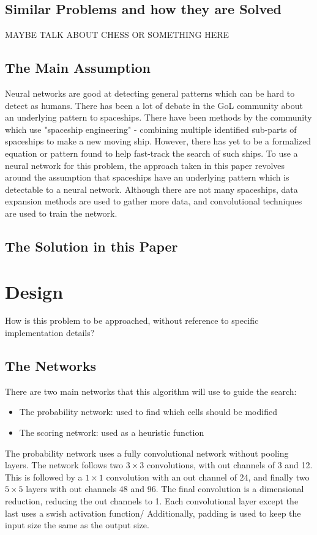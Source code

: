 \documentclass{l4proj}
\begin{document}
\section{Similar Problems and how they are Solved}

MAYBE TALK ABOUT CHESS OR SOMETHING HERE

\section{The Main Assumption}
Neural networks are good at detecting general patterns which can be hard to detect as humans. There has been a lot of debate in the GoL community about an underlying pattern to spaceships. There have been methods by the community which use "spaceship engineering" - combining multiple identified sub-parts of spaceships to make a new moving ship. However, there has yet to be a formalized equation or pattern found to help fast-track the search of such ships. To use a neural network for this problem, the approach taken in this paper revolves around the assumption that spaceships have an underlying pattern which is detectable to a neural network. Although there are not many spaceships, data expansion methods are used to gather more data, and convolutional techniques are used to train the network.

\section{The Solution in this Paper}


\chapter{Design}
How is this problem to be approached, without reference to specific implementation details? 

\section{The Networks}
There are two main networks that this algorithm will use to guide the search:
\begin{itemize}
    \item The probability network: used to find which cells should be modified
    \item The scoring network: used as a heuristic function
\end{itemize}
The probability network uses a fully convolutional network without pooling layers. The network follows two $3 \times 3$ convolutions, with out channels of 3 and 12. This is followed by a $1 \times 1$ convolution with an out channel of 24, and finally two $5 \times 5$ layers with out channels 48 and 96. The final convolution is a dimensional reduction, reducing the out channels to 1. Each convolutional layer except the last uses a swish activation function/ Additionally, padding is used to keep the input size the same as the output size.
\end{document}
